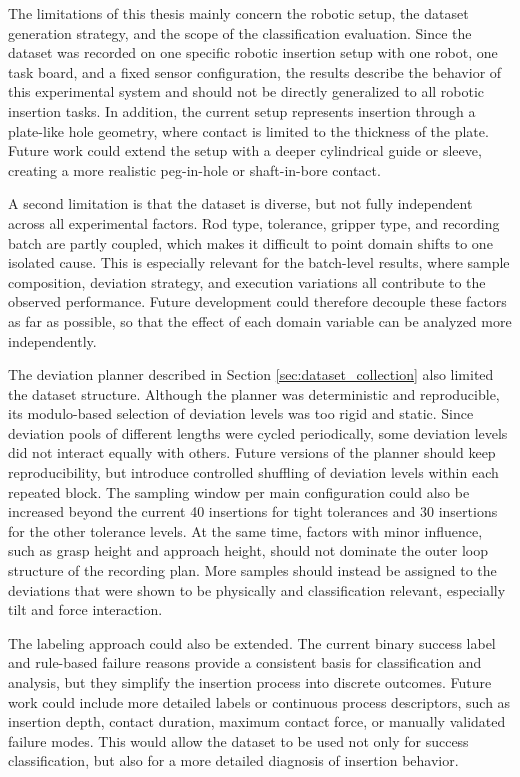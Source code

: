 The limitations of this thesis mainly concern the robotic setup, the dataset generation strategy, and the scope of the classification evaluation. Since the dataset was recorded on one specific robotic insertion setup with one robot, one task board, and a fixed sensor configuration, the results describe the behavior of this experimental system and should not be directly generalized to all robotic insertion tasks. In addition, the current setup represents insertion through a plate-like hole geometry, where contact is limited to the thickness of the plate. Future work could extend the setup with a deeper cylindrical guide or sleeve, creating a more realistic peg-in-hole or shaft-in-bore contact.

A second limitation is that the dataset is diverse, but not fully independent across all experimental factors. Rod type, tolerance, gripper type, and recording batch are partly coupled, which makes it difficult to point domain shifts to one isolated cause. This is especially relevant for the batch-level results, where sample composition, deviation strategy, and execution variations all contribute to the observed performance. Future development could therefore decouple these factors as far as possible, so that the effect of each domain variable can be analyzed more independently.

The deviation planner described in Section \ref{sec:dataset_collection} also limited the dataset structure. Although the planner was deterministic and reproducible, its modulo-based selection of deviation levels was too rigid and static. Since deviation pools of different lengths were cycled periodically, some deviation levels did not interact equally with others. Future versions of the planner should keep reproducibility, but introduce controlled shuffling of deviation levels within each repeated block. The sampling window per main configuration could also be increased beyond the current 40 insertions for tight tolerances and 30 insertions for the other tolerance levels. At the same time, factors with minor influence, such as grasp height and approach height, should not dominate the outer loop structure of the recording plan. More samples should instead be assigned to the deviations that were shown to be physically and classification relevant, especially tilt and force interaction.

The labeling approach could also be extended. The current binary success label and rule-based failure reasons provide a consistent basis for classification and analysis, but they simplify the insertion process into discrete outcomes. Future work could include more detailed labels or continuous process descriptors, such as insertion depth, contact duration, maximum contact force, or manually validated failure modes. This would allow the dataset to be used not only for success classification, but also for a more detailed diagnosis of insertion behavior.

